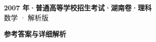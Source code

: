 \documentclass[zihao=-4, a4paper]{ctexart}
\begin{document}
\begin{center}
  {\Large\bfseries 2007 年·普通高等学校招生考试·湖南卷·理科}\\[4pt]
  {\large 数学 · 解析版}
\end{center}
\medskip
{}

\clearpage
{}
\begin{center}{\Large\bfseries 参考答案与详细解析}\end{center}
\medskip

\end{document}
